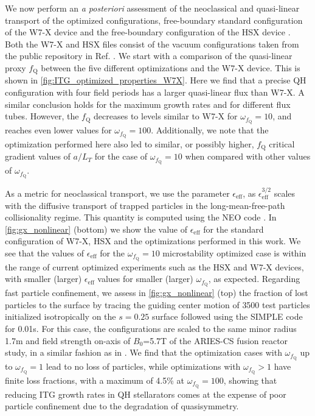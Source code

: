 \documentclass[prl,twocolumn,amsmath,amssymb,showpacs,superscriptaddress]{revtex4-2}
\begin{document}
We now perform an \textit{a posteriori} assessment of the neoclassical {and quasi-linear transport} of the optimized configurations{,} {free-boundary} standard configuration of the W7-X device \cite{Beidler1990} {and the free-boundary configuration of the HSX device \cite{Anderson1995}. Both the W7-X and HSX files consist of the vacuum configurations taken from the public repository in Ref. \cite{vmec_equilibria}}.
%
{
We start with a comparison of the quasi-linear proxy $f_\text{Q}$ between the five different optimizations and the W7-X device.
%
This is shown in \cref{fig:ITG_optimized_properties_W7X}.
%
Here we find that a precise QH configuration with four field periods has a larger quasi-linear flux than W7-X.
%
A similar conclusion holds for the maximum growth rates and for different flux tubes.
%
However, the $f_\text{Q}$ decreases to levels similar to W7-X for $\omega_{f_{\text{Q}}}=10$, and reaches even lower values for $\omega_{f_{\text{Q}}}=100$.
%
Additionally, we note that the optimization performed here also led to {similar, or possibly higher,} $f_\text{Q}$ critical gradient values of $a/L_T$ for the case of $\omega_{f_{\text{Q}}}=10$ when compared with other values of $\omega_{f_{\text{Q}}}$.
}

As a metric for neoclassical transport, we use the 
{
parameter $\epsilon_{\text{eff}}$,
as $\epsilon_{\text{eff}}^{3/2}$
scales with the diffusive transport of trapped
particles in the long-mean-free-path collisionality regime.
}
%
This quantity is computed using the NEO code \cite{Nemov1999}.
%
In \cref{fig:gx_nonlinear} {(bottom)} we show the value of $\epsilon_{\text{eff}}$ for {the standard configuration of W7-X, HSX and the optimizations performed in this work.}
%
We see that the values of $\epsilon_{\text{eff}}$ for the {$\omega_{f_{\text{Q}}}=10$} microstability optimized case {is} within the range of current optimized experiments such as the HSX \cite{Anderson1995} and W7-X \cite{Beidler1990} devices{, with smaller (larger) $\epsilon_{\text{eff}}$ values for smaller (larger) $\omega_{f_{\text{Q}}}$, as expected}.
%
Regarding fast particle confinement, we assess in {\cref{fig:gx_nonlinear} (top)} the fraction of lost particles to the surface by tracing the guiding center motion of {3500} test particles initialized isotropically on the $s = 0.25$ surface followed using the SIMPLE code \cite{Albert2020} for {0.01}s.
%
For this case, the configurations are scaled to the same minor radius 1.7m and field strength on-axis of $B_0$=5.7T of the ARIES-CS fusion reactor study, in a similar fashion as in \cite{Bader2019,Landreman2022}.
%
We find that the optimization {cases with $\omega_{f_{\text{Q}}}$ up to $\omega_{f_{\text{Q}}}=1$} lead to no loss of particles, while {optimizations with $\omega_{f_{\text{Q}}}>1$ have finite loss fractions, with a maximum of 4.5\% at $\omega_{f_{\text{Q}}}=100$}, showing that reducing ITG growth rates in QH stellarators comes at the expense of poor particle confinement due to the degradation of quasisymmetry.
\end{document}
